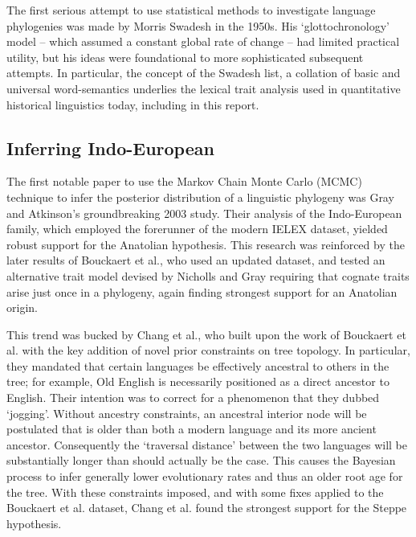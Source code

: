 \documentclass[10pt,journal,compsoc]{IEEEtran}
\begin{document}
The first serious attempt to use statistical methods to investigate language phylogenies was made by Morris Swadesh in the 1950s. His `glottochronology' model -- which assumed a constant global rate of change -- had limited practical utility, but his ideas were foundational to more sophisticated subsequent attempts.\cite{swadesh1955towards} In particular, the concept of the Swadesh list, a collation of basic and universal word-semantics underlies the lexical trait analysis used in quantitative historical linguistics today, including in this report.
\subsection{Inferring Indo-European}

The first notable paper to use the Markov Chain Monte Carlo (MCMC) technique to infer the posterior distribution of a linguistic phylogeny was Gray and Atkinson's groundbreaking 2003 study. Their analysis of the Indo-European family, which employed the forerunner of the modern IELEX dataset, yielded robust support for the Anatolian hypothesis.\cite{gray2003language} This research was reinforced by the later results of Bouckaert et al.\cite{bouckaert2012mapping}\cite{bouckaert2013correction}, who used an updated dataset, and tested an alternative trait model devised by Nicholls and Gray\cite{nicholls2008dated} requiring that cognate traits arise just once in a phylogeny, again finding strongest support for an Anatolian origin.

This trend was bucked by Chang et al., who built upon the work of Bouckaert et al. with the key addition of novel prior constraints on tree topology.\cite{chang2015ancestry} In particular, they mandated that certain languages be effectively ancestral to others in the tree; for example, Old English is necessarily positioned as a direct ancestor to English. Their intention was to correct for a phenomenon that they dubbed `jogging'. Without ancestry constraints, an ancestral interior node will be postulated that is older than both a modern language and its more ancient ancestor. Consequently the `traversal distance' between the two languages will be substantially longer than should actually be the case. This causes the Bayesian process to infer generally lower evolutionary rates and thus an older root age for the tree. With these constraints imposed, and with some fixes applied to the Bouckaert et al. dataset, Chang et al. found the strongest support for the Steppe hypothesis.
\end{document}
